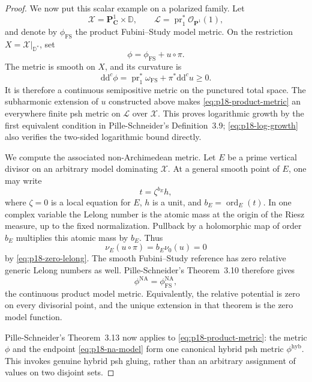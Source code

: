 \begin{proof}
We now put this scalar example on a polarized family.  Let
\[
 \mathcal X=\mathbf P^1_{\mathbf C}\times\mathbb D,\qquad
 \mathcal L=\operatorname{pr}_1^*\mathcal O_{\mathbf P^1}(1),
\]
and denote by \(\phi_{\mathrm{FS}}\) the product Fubini--Study model
metric.  On the restriction \(X=\mathcal X|_{\mathbb D^*}\), set
\[
                       \phi=\phi_{\mathrm{FS}}+u\circ\pi .
\tag{11}\label{eq:p18-product-metric}
\]
The metric is smooth on \(X\), and its curvature is
\[
 \mathrm d\mathrm d^c\phi
 =
 \operatorname{pr}_1^*\omega_{\mathrm{FS}}
 +\pi^*\mathrm d\mathrm d^c u
 \geq0.
\tag{12}\label{eq:p18-positive-curvature}
\]
It is therefore a continuous semipositive metric on the punctured total
space.  The subharmonic extension of \(u\) constructed above makes
\eqref{eq:p18-product-metric} an everywhere finite psh metric on
\(\mathcal L\) over \(\mathcal X\).  This proves logarithmic growth by
the first equivalent condition in Pille-Schneider's Definition~3.9;
\eqref{eq:p18-log-growth} also verifies the two-sided logarithmic bound
directly.

We compute the associated non-Archimedean metric.  Let \(E\) be a prime
vertical divisor on an arbitrary model dominating \(\mathcal X\).  At a
general smooth point of \(E\), one may write
\[
                          t=\zeta^{b_E}h,
\]
where \(\zeta=0\) is a local equation for \(E\), \(h\) is a unit, and
\(b_E=\operatorname{ord}_E(t)\).  In one complex variable the Lelong
number is the atomic mass at the origin of the Riesz measure, up to the
fixed normalization.  Pullback by a holomorphic map of order \(b_E\)
multiplies this atomic mass by \(b_E\).  Thus
\[
                 \nu_E(u\circ\pi)
                 =b_E\nu_0(u)=0
\tag{13}\label{eq:p18-all-divisorial-zero}
\]
by \eqref{eq:p18-zero-lelong}.  The smooth Fubini--Study reference has
zero relative generic Lelong numbers as well.  Pille-Schneider's
Theorem~3.10 therefore gives
\[
                  \phi^{\mathrm{NA}}
                  =\phi_{\mathrm{FS}}^{\mathrm{NA}},
\tag{14}\label{eq:p18-na-model}
\]
the continuous product model metric.  Equivalently, the relative
potential is zero on every divisorial point, and the unique extension in
that theorem is the zero model function.

Pille-Schneider's Theorem~3.13 now applies to
\eqref{eq:p18-product-metric}: the metric \(\phi\) and the endpoint
\eqref{eq:p18-na-model} form one canonical hybrid psh metric
\(\phi^{\mathrm{hyb}}\).  This invokes genuine hybrid psh gluing, rather
than an arbitrary assignment of values on two disjoint sets.


\end{proof}
